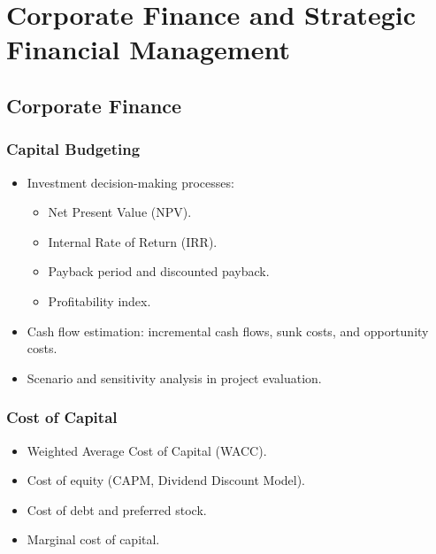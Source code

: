\chapter{Corporate Finance and Strategic Financial Management}

\section{Corporate Finance}
\subsection{Capital Budgeting}
\begin{itemize}
  \item Investment decision-making processes:
  \begin{itemize}
    \item Net Present Value (NPV).
    \item Internal Rate of Return (IRR).
    \item Payback period and discounted payback.
    \item Profitability index. 
  \end{itemize}
  \item Cash flow estimation: incremental cash flows, sunk costs, and opportunity costs.
  \item Scenario and sensitivity analysis in project evaluation.
\end{itemize}

\subsection{Cost of Capital}
\begin{itemize}
  \item Weighted Average Cost of Capital (WACC).
  \item Cost of equity (CAPM, Dividend Discount Model).
  \item Cost of debt and preferred stock.
  \item Marginal cost of capital.
\end{itemize}

